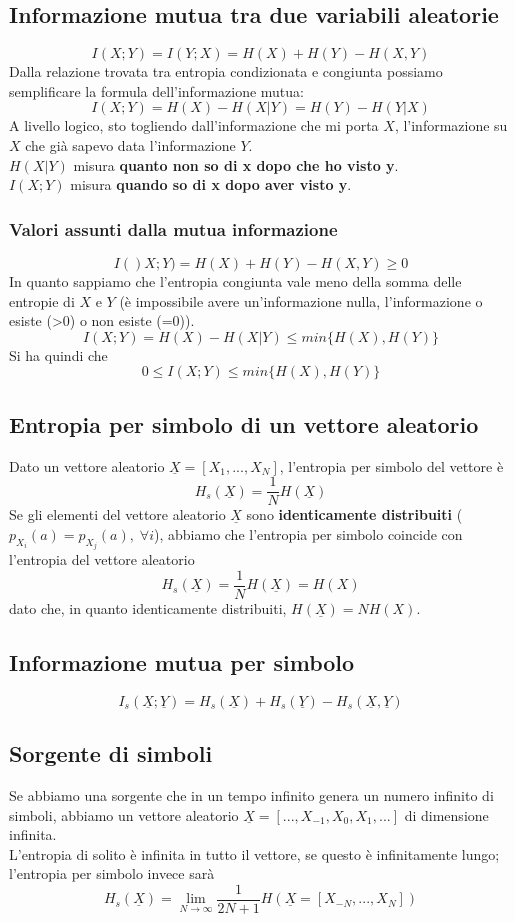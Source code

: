 \documentclass{article}
\begin{document}
\subsection{Informazione mutua tra due variabili aleatorie}
$$I(X;Y)=I(Y;X)=H(X)+H(Y)-H(X,Y)$$
Dalla relazione trovata tra entropia condizionata e congiunta possiamo semplificare la formula dell'informazione mutua:
$$I(X;Y)=H(X)-H(X|Y)=H(Y)-H(Y|X)$$
A livello logico, sto togliendo dall'informazione che mi porta $X$, l'informazione su $X$ che già sapevo data l'informazione $Y$.\\
$H(X|Y)$ misura \textbf{quanto non so di x dopo che ho visto y}.\\
$I(X;Y)$ misura \textbf{quando so di x dopo aver visto y}.\\

\subsubsection{Valori assunti dalla mutua informazione}
$$I()X;Y)=H(X)+H(Y)-H(X,Y)\geq0$$
In quanto sappiamo che l'entropia congiunta vale meno della somma delle entropie di $X$ e $Y$ (è impossibile avere un'informazione nulla, l'informazione o esiste (>0) o non esiste (=0)).\\
$$I(X;Y)=H(X)-H(X|Y)\leq min\{H(X),H(Y)\}$$
Si ha quindi che $$0\leq I(X;Y)\leq min\{H(X),H(Y)\}$$

\subsection{Entropia per simbolo di un vettore aleatorio}
Dato un vettore aleatorio $\underline{X}=[X_1,...,X_N]$, l'entropia per simbolo del vettore è $$H_s(\underline{X})=\frac{1}{N}H(\underline{X})$$
Se gli elementi del vettore aleatorio $\underline{X}$ sono \textbf{identicamente distribuiti} ($p_{X_i}(a)=p_{X_j}(a),\;\forall i$), abbiamo che l'entropia per simbolo coincide con l'entropia del vettore aleatorio $$H_s(\underline{X})=\frac{1}{N}H(\underline{X})=H(X)$$
dato che, in quanto identicamente distribuiti, $H(\underline{X})=NH(X)$.

\subsection{Informazione mutua per simbolo}
$$I_s(\underline{X};\underline{Y})=H_s(\underline{X})+H_s(\underline{Y})-H_s(\underline{X},\underline{Y})$$

\subsection{Sorgente di simboli}
Se abbiamo una sorgente che in un tempo infinito genera un numero infinito di simboli, abbiamo un vettore aleatorio $\underline{X}=[...,X_{-1},X_0,X_1,...]$ di dimensione infinita.\\
L'entropia di solito è infinita in tutto il vettore, se questo è infinitamente lungo; l'entropia per simbolo invece sarà $$H_s(\underline{X})=\lim_{N\to\infty}\frac{1}{2N+1}H(\underline{X}=[X_{-N},...,X_N])$$
\end{document}
